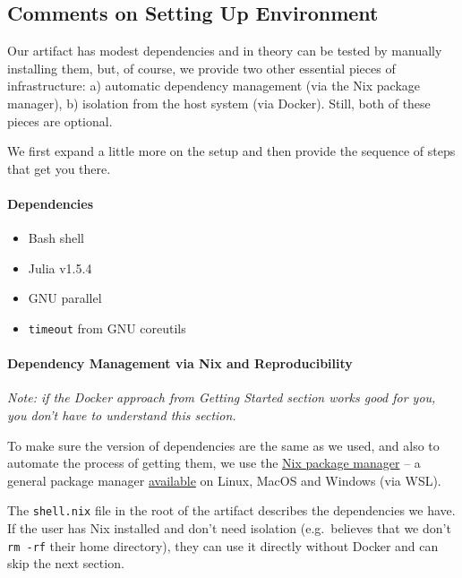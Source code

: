 \documentclass[
]{article}
\begin{document}
\hypertarget{comments-on-setting-up-environment}{%
\subsection{Comments on Setting Up
Environment}\label{comments-on-setting-up-environment}}

Our artifact has modest dependencies and in theory can be tested by
manually installing them, but, of course, we provide two other essential
pieces of infrastructure: a) automatic dependency management (via the
Nix package manager), b) isolation from the host system (via Docker).
Still, both of these pieces are optional.

We first expand a little more on the setup and then provide the sequence
of steps that get you there.

\hypertarget{dependencies}{%
\paragraph{Dependencies}\label{dependencies}}

\begin{itemize}
\item
  Bash shell
\item
  Julia v1.5.4
\item
  GNU parallel
\item
  \texttt{timeout} from GNU coreutils
\end{itemize}

\hypertarget{dependency-management-via-nix-and-reproducibility}{%
\paragraph{Dependency Management via Nix and
Reproducibility}\label{dependency-management-via-nix-and-reproducibility}}

\textit{Note: if the Docker approach from Getting Started section works good for
you, you don't have to understand this section.}

To make sure the version of dependencies are the same as we used, and
also to automate the process of getting them, we use the
\href{https://nixos.org/manual/nix/stable/\#chap-introduction}{Nix
package manager} -- a general package manager
\href{https://nixos.org/guides/install-nix.html}{available} on Linux,
MacOS and Windows (via WSL).

The \texttt{shell.nix} file in the root of the artifact describes the
dependencies we have. If the user has Nix installed and don't need
isolation (e.g.~believes that we don't \texttt{rm\ -rf} their home
directory), they can use it directly without Docker and can skip the
next section.
\end{document}
